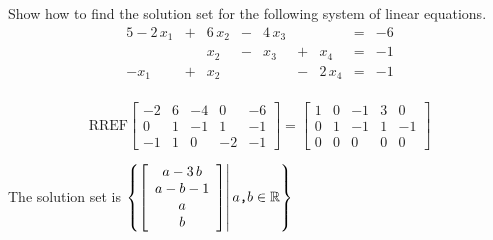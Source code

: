 
\begin{exerciseStatement}


Show how to find the solution set for the following system of linear equations. 
\begin{alignat*}{5} -2 \, x_{1} &+& 6 \, x_{2} &-& 4 \, x_{3} & &  &=& -6 \\ & & x_{2} &-& x_{3} &+& x_{4} &=& -1 \\-x_{1} &+& x_{2} & &  &-& 2 \, x_{4} &=& -1 \\ \end{alignat*}
            


\end{exerciseStatement}
    
\begin{exerciseAnswer} 
\[\mathrm{RREF} \left[\begin{array}{cccc|c}
-2 & 6 & -4 & 0 & -6 \\
0 & 1 & -1 & 1 & -1 \\
-1 & 1 & 0 & -2 & -1
\end{array}\right]  =  \left[\begin{array}{cccc|c}
1 & 0 & -1 & 3 & 0 \\
0 & 1 & -1 & 1 & -1 \\
0 & 0 & 0 & 0 & 0
\end{array}\right] \]

The solution set is \( \left\{ \left[\begin{array}{c}
a - 3 \, b \\
a - b - 1 \\
a \\
b
\end{array}\right] \middle|\,a\text{\texttt{,}}b\in\mathbb{R}\right\} \)


\end{exerciseAnswer}
    
